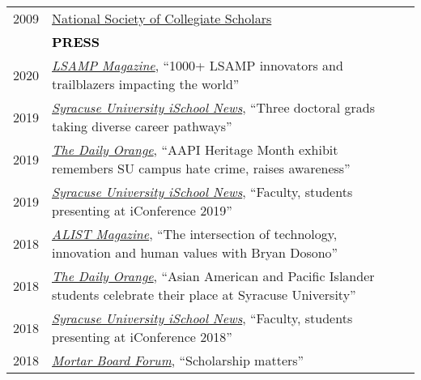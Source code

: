\documentclass[11pt]{article}
\begin{document}
{{\begin{longtable}{Rp{0.75in}p{5.0in}}
\footnotesize{2009} & \href{https://nscs.org/}{{National Society of Collegiate Scholars}}\\

& \textcolor{black}{\uppercase{\textbf{Press}}}\\

\footnotesize{2020} & \href{https://lsmrce.org/documents/community/LSAMP-Trailblazers-Magazine-2020.pdf}{\textit{{LSAMP Magazine}}}, ``1000+ LSAMP innovators and trailblazers impacting the world''\\

\footnotesize{2019} & \href{https://ischool.syr.edu/three-doctoral-grads-taking-diverse-career-pathways-2019/}{\textit{{Syracuse University iSchool News}}}, ``Three doctoral grads taking diverse career pathways''\\

\footnotesize{2019} & \href{http://dailyorange.com/2019/04/aapi-heritage-month-exhibit-remembers-su-campus-hate-crime-raises-awareness/}{\textit{{The Daily Orange}}}, ``AAPI Heritage Month exhibit remembers SU campus hate crime, raises awareness''\\

\footnotesize{2019} & \href{https://ischool.syr.edu/faculty-students-presenting-at-iconference-2019/}{\textit{{Syracuse University iSchool News}}}, ``Faculty, students presenting at iConference 2019''\\

\footnotesize{2018} & \href{https://issuu.com/alist_magazine/docs/alist_summer_2018_final}{\textit{{ALIST Magazine}}}, ``The intersection of technology, innovation and human values with Bryan Dosono''\\

\footnotesize{2018} & \href{http://dailyorange.com/2018/04/asian-american-pacific-islander-students-celebrate-place-syracuse-university/}{\textit{{The Daily Orange}}}, ``Asian American and Pacific Islander students celebrate their place at Syracuse University''\\

\footnotesize{2018} & \href{https://ischool.syr.edu/faculty-students-presenting-iconference-2018/}{\textit{{Syracuse University iSchool News}}}, ``Faculty, students presenting at iConference 2018''\\

\footnotesize{2018} & \href{http://cdn.coverstand.com/35468/480339/07e4eb31edcfe2fac898ccb79316b89262b1bbe7.pdf}{\textit{{Mortar Board Forum}}}, ``Scholarship matters''\\


\end{longtable}}}
\end{document}
